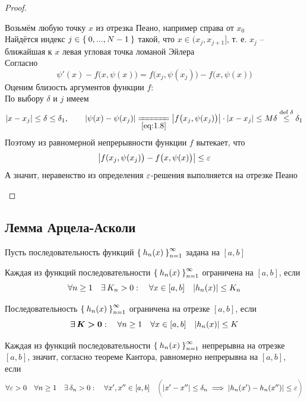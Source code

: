 \begin{proof}
\begin{enumerate}
        Возьмём любую точку $ x $ из отрезка Пеано, например справа от $ x_0 $ \\
        Найдётся индекс $ j \in \Set{0, ..., N - 1} $ такой, что $ x \in (x_j, x_{j + 1}] $, т. е. $ x_j $ -- ближайшая к $ x $ левая угловая точка ломаной Эйлера \\
        Согласно 
        $$ \psi'(x) - f \big(x, \psi(x) \big) = f \big( x_j, \psi(x_j) \big) - f \big( x, \psi(x) \big) $$
        Оценим близость аргументов функции $ f $: \\
        По выбору $ \delta $ и $ j $ имеем
        $$ |x - x_j| \le \delta \le \delta_1, \qquad |\psi(x) - \psi(x_j)| \undereq{\eref{1.8}} \big| f \big( x_j, \psi(x_j) \big) \big| \cdot |x - x_j| \le M\delta \bdef[\le]\delta \delta_1 $$
        Поэтому из равномерной непрерывности функции $ f $ вытекает, что
        $$ \big| f(x_j, \psi(x_j) \big) - f \big( x, \psi(x) \big) \big| \le \varepsilon $$
        А значит, неравенство  из определения $ \varepsilon $-решения выполняется на отрезке Пеано
    \end{enumerate}
\end{proof}

\subsection{Лемма Арцела-Асколи}

Пусть последовательность функций $ \Set{h_n(x)}_{n=1}^{\infty} $ задана на $ [a, b] $

\begin{definition}
    Каждая из функций последовательности $ \Set{h_n(x)}_{n=1}^{\infty} $ ограничена на $ [a, b] $, если
    $$ \forall n \ge 1 \quad \exists\, K_n > 0 : \quad \forall x \in [a, b] \quad |h_n(x)| \le K_n $$
\end{definition}

\begin{definition}\label{def:clamp:eq}
    Последовательность $ \Set{h_n(x)}_{n=1}^{\infty} $  ограничена на отрезке $ [a, b] $, если
    $$ \bm{\exists\, K > 0} : \quad \forall n \ge 1 \quad \forall x \in [a, b] \quad |h_n(x)| \le K $$
\end{definition}

\begin{definition}
    Каждая из функций последовательности $ \Set{h_n(x)}_{n=1}^{\infty} $ непрерывна на отрезке $ [a, b] $, значит, согласно теореме Кантора, равномерно непрерывна на $ [a, b] $, если
    $$ \forall \veps > 0 \quad \forall n \ge 1 \quad \exist \delta_n > 0 : \quad \forall x', x'' \in [a, b] \quad \nimp[\bigg(] |x' - x''| \le \delta_n \implies |h_n(x') - h_n(x'')| \le \veps \nimp[\bigg)] $$
\end{definition}

